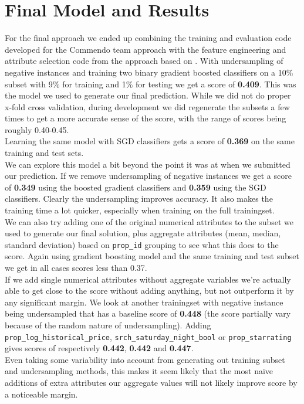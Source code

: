 \documentclass{llncs}
\begin{document}
\section{Final Model and Results}
For the final approach we ended up combining the training and evaluation code developed for the Commendo team approach with the feature engineering and attribute selection code from the approach based on \cite{DBLP:journals/corr/LiuXZYPLSW13}. With undersampling of negative instances and training two binary gradient boosted classifiers on a 10\% subset with 9\% for training and 1\% for testing we get a score of \textbf{0.409}. This was the model we used to generate our final prediction. While we did not do proper x-fold cross validation, during development we did regenerate the subsets a few times to get a more accurate sense of the score, with the range of scores being roughly 0.40-0.45.\\
Learning the same model with SGD classifiers gets a score of \textbf{0.369} on the same training and test sets. \\
We can explore this model a bit beyond the point it was at when we submitted our prediction. If we remove undersampling of negative instances we get a score of \textbf{0.349} using the boosted gradient classifiers and \textbf{0.359} using the SGD classifiers. Clearly the undersampling improves accuracy. It also makes the training time a lot quicker, especially when training on the full trainingset.\\
We can also try adding one of the original numerical attributes to the subset we used to generate our final solution, plus aggregate attributes (mean, median, standard deviation) based on \verb!prop_id! grouping to see what this does to the score. Again using gradient boosting model and the same training and test subset we get in all cases scores less than 0.37.\\
If we add single numerical attributes without aggregate variables we're actually able to get close to the score without adding anything, but not outperform it by any significant margin. We look at another trainingset with negative instance being undersampled that has a baseline score of \textbf{0.448} (the score partially vary because of the random nature of undersampling). Adding \verb!prop_log_historical_price!, \verb!srch_saturday_night_bool! or \verb!prop_starrating! gives scores of respectively \textbf{0.442}, \textbf{0.442} and \textbf{0.447}.\\
Even taking some variability into account from generating out training subset and undersampling methods, this makes it seem likely that the most na\"ive additions of extra attributes our aggregate values will not likely improve score by a noticeable margin.
\end{document}
